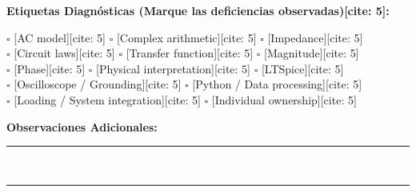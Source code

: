 \documentclass[11pt, a4paper]{article}
\begin{document}
\vspace{0.4cm}
\textbf{Etiquetas Diagnósticas (Marque las deficiencias observadas)[cite: 5]:}
\begin{tcolorbox}[colback=gray!10!white, colframe=black, boxrule=0.5pt]
    $\square$ [AC model][cite: 5] \hfill $\square$ [Complex arithmetic][cite: 5] \hfill $\square$ [Impedance][cite: 5] \\
    $\square$ [Circuit laws][cite: 5] \hfill $\square$ [Transfer function][cite: 5] \hfill $\square$ [Magnitude][cite: 5] \\
    $\square$ [Phase][cite: 5] \hfill $\square$ [Physical interpretation][cite: 5] \hfill $\square$ [LTSpice][cite: 5] \\
    $\square$ [Oscilloscope / Grounding][cite: 5] \hfill $\square$ [Python / Data processing][cite: 5] \\
    $\square$ [Loading / System integration][cite: 5] \hfill $\square$ [Individual ownership][cite: 5]
\end{tcolorbox}

\vspace{0.4cm}
\textbf{Observaciones Adicionales:} \\
\rule{\textwidth}{0.4pt} \\
\rule{\textwidth}{0.4pt}
\end{document}

